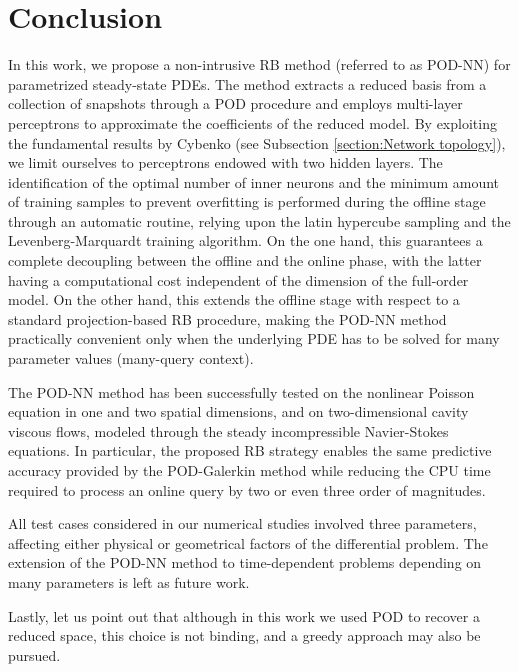 \documentclass[longtitle]{elsarticle}
\numberwithin{equation}{section}
\theoremstyle{theorem}
\theoremstyle{definition}
\theoremstyle{remark}
\theoremstyle{proposition}
\numberwithin{figure}{section}
\begin{document}
	
	
	\section{Conclusion}
	\label{section:Conclusion}	
	
		In this work, we propose a non-intrusive RB method (referred to as POD-NN) for parametrized steady-state PDEs. The method extracts a reduced basis from a collection of snapshots through a POD procedure and employs multi-layer perceptrons to approximate the coefficients of the reduced model. By exploiting the fundamental results by Cybenko (see Subsection \ref{section:Network topology}), we limit ourselves to perceptrons endowed with two hidden layers. The identification of the optimal number of inner neurons and the minimum amount of training samples to prevent overfitting is performed during the offline stage through an automatic routine, relying upon the latin hypercube sampling and the Levenberg-Marquardt training algorithm. On the one hand, this guarantees a complete decoupling between the offline and the online phase, with the latter having a computational cost independent of the dimension of the full-order model. On the other hand, this extends the offline stage with respect to a standard projection-based RB procedure, making the POD-NN method practically convenient only when the underlying PDE has to be solved for many parameter values (many-query context). 		

		The POD-NN method has been successfully tested on the nonlinear Poisson equation in one and two spatial dimensions, and on two-dimensional cavity viscous flows, modeled through the steady incompressible Navier-Stokes equations. In particular, the proposed RB strategy enables the same predictive accuracy provided by the POD-Galerkin method while reducing the CPU time required to process an online query by two or even three order of magnitudes.		

		All test cases considered in our numerical studies involved three parameters, affecting either physical or geometrical factors of the differential problem. The extension of the POD-NN method to time-dependent problems depending on many parameters is left as future work. 		

		Lastly, let us point out that although in this work we used POD to recover a reduced space, this choice is not binding, and a greedy approach may also be pursued. 
		
	
		
\end{document}

